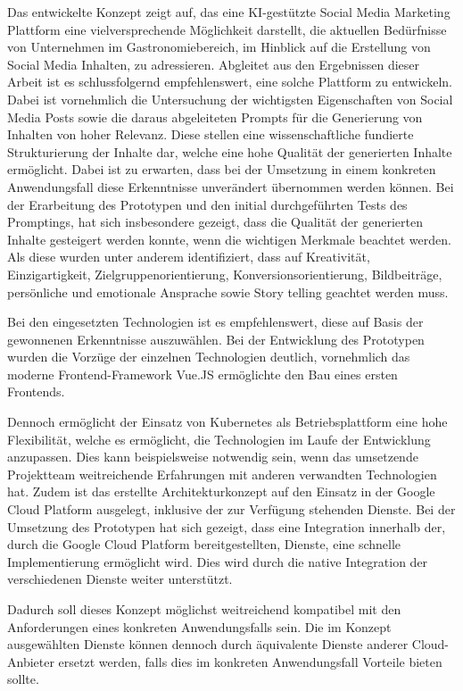 Das entwickelte Konzept zeigt auf, das eine KI-gestützte Social Media Marketing Plattform eine vielversprechende Möglichkeit darstellt, die aktuellen Bedürfnisse von Unternehmen im Gastronomiebereich, im Hinblick auf die Erstellung von Social Media Inhalten, zu adressieren.
Abgleitet aus den Ergebnissen dieser Arbeit ist es schlussfolgernd empfehlenswert, eine solche Plattform zu entwickeln.
Dabei ist vornehmlich die Untersuchung der wichtigsten Eigenschaften von Social Media Posts sowie die daraus abgeleiteten Prompts für die Generierung von Inhalten von hoher Relevanz.
Diese stellen eine wissenschaftliche fundierte Strukturierung der Inhalte dar, welche eine hohe Qualität der generierten Inhalte ermöglicht.
Dabei ist zu erwarten, dass bei der Umsetzung in einem konkreten Anwendungsfall diese Erkenntnisse unverändert übernommen werden können.
Bei der Erarbeitung des Prototypen und den initial durchgeführten Tests des Promptings, hat sich insbesondere gezeigt, dass die Qualität der generierten Inhalte gesteigert werden konnte, wenn die wichtigen Merkmale beachtet werden.
Als diese wurden unter anderem identifiziert, dass auf Kreativität, Einzigartigkeit, Zielgruppenorientierung, Konversionsorientierung, Bildbeiträge, persönliche und emotionale Ansprache sowie Story telling geachtet werden muss.

Bei den eingesetzten Technologien ist es empfehlenswert, diese auf Basis der gewonnenen Erkenntnisse auszuwählen.
Bei der Entwicklung des Prototypen wurden die Vorzüge der einzelnen Technologien deutlich, vornehmlich das moderne Frontend-Framework Vue.JS ermöglichte den Bau eines ersten Frontends.

Dennoch ermöglicht der Einsatz von Kubernetes als Betriebsplattform eine hohe Flexibilität, welche es ermöglicht, die Technologien im Laufe der Entwicklung anzupassen.
Dies kann beispielsweise notwendig sein, wenn das umsetzende Projektteam weitreichende Erfahrungen mit anderen verwandten Technologien hat.
Zudem ist das erstellte Architekturkonzept auf den Einsatz in der Google Cloud Platform ausgelegt, inklusive der zur Verfügung stehenden Dienste.
Bei der Umsetzung des Prototypen hat sich gezeigt, dass eine Integration innerhalb der, durch die Google Cloud Platform bereitgestellten, Dienste, eine schnelle Implementierung ermöglicht wird.
Dies wird durch die native Integration der verschiedenen Dienste weiter unterstützt.

Dadurch soll dieses Konzept möglichst weitreichend kompatibel mit den Anforderungen eines konkreten Anwendungsfalls sein.
Die im Konzept ausgewählten Dienste können dennoch durch äquivalente Dienste anderer Cloud-Anbieter ersetzt werden, falls dies im konkreten Anwendungsfall Vorteile bieten sollte.

